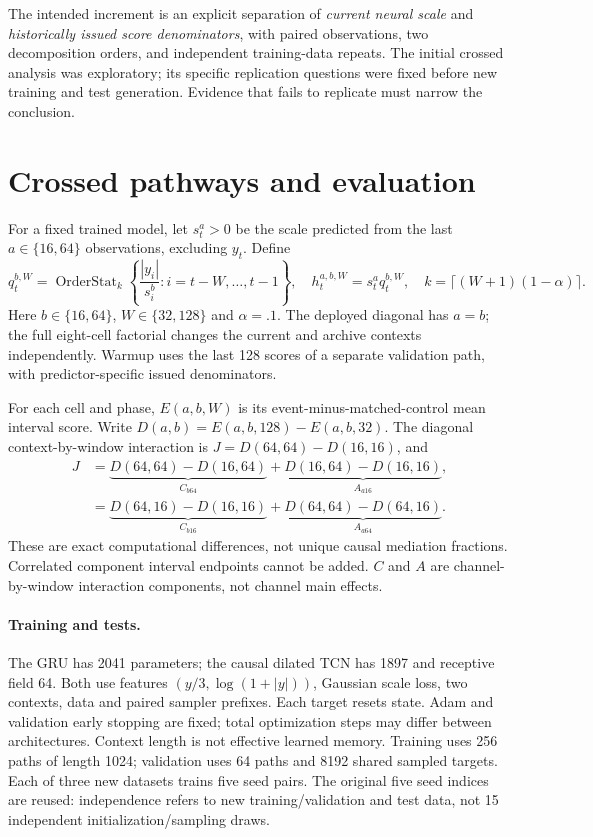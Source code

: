 \documentclass{article}
\begin{document}
The intended increment is an explicit separation of \emph{current neural
scale} and \emph{historically issued score denominators}, with paired
observations, two decomposition orders, and independent training-data
repeats. The initial crossed analysis was exploratory; its specific
replication questions were fixed before new training and test generation.
Evidence that fails to replicate must narrow the conclusion.

\clearpage
\section{Crossed pathways and evaluation}
For a fixed trained model, let $s_t^a>0$ be the scale predicted from the last
$a\in\{16,64\}$ observations, excluding $y_t$. Define
\begin{equation}
 q_t^{b,W}=\operatorname{OrderStat}_{k}
 \left\{\frac{|y_i|}{s_i^b}:i=t-W,\ldots,t-1\right\},
 \quad h_t^{a,b,W}=s_t^a q_t^{b,W},
 \quad k=\lceil(W+1)(1-\alpha)\rceil.
\end{equation}
Here $b\in\{16,64\}$, $W\in\{32,128\}$ and $\alpha=.1$.
The deployed diagonal has $a=b$; the full eight-cell factorial changes the
current and archive contexts independently. Warmup uses the last 128 scores
of a separate validation path, with predictor-specific issued denominators.

For each cell and phase, $E(a,b,W)$ is its event-minus-matched-control
mean interval score. Write $D(a,b)=E(a,b,128)-E(a,b,32)$. The diagonal
context-by-window interaction is $J=D(64,64)-D(16,16)$, and
\begin{align}
 J&=\underbrace{D(64,64)-D(16,64)}_{C_{b64}}
   +\underbrace{D(16,64)-D(16,16)}_{A_{a16}},\\
  &=\underbrace{D(64,16)-D(16,16)}_{C_{b16}}
   +\underbrace{D(64,64)-D(64,16)}_{A_{a64}}.
\end{align}
These are exact computational differences, not unique causal mediation
fractions. Correlated component interval endpoints cannot be added.
$C$ and $A$ are channel-by-window interaction components, not channel main effects.

\paragraph{Training and tests.}
The GRU \citep{gru} has 2041 parameters; the causal dilated TCN
\citep{tcn} has 1897 and receptive field 64. Both use features $(y/3,\log(1+|y|))$, Gaussian scale loss, two
contexts, data and paired sampler prefixes. Each target resets state.
Adam and validation early stopping are fixed; total optimization steps may
differ between architectures. Context length is not effective learned memory.
Training uses 256 paths of length 1024; validation uses 64 paths and 8192 shared
sampled targets. Each of three new datasets trains five seed pairs.
The original five seed indices are reused: independence refers to new
training/validation and test data, not 15 independent initialization/sampling draws.
\end{document}
